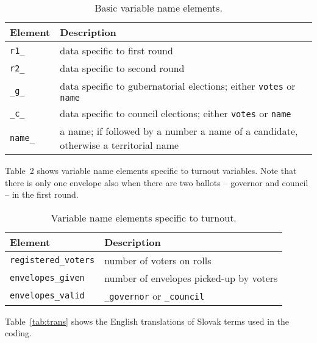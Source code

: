 \documentclass[11pt, a4paper]{article}
\begin{document}
\begin{table}[H]\footnotesize
	\label{tab:modules}
	\caption{Basic variable name elements.}
	\begin{center}
		\begin{tabular}{ll}
			\toprule
			Element	& Description \\		
			\midrule
			\texttt{r1\_}	&	data specific to first round \\
			\texttt{r2\_}	&	data specific to second round \\
			\texttt{\_g\_}	&	data specific to gubernatorial elections; either \texttt{votes} or \texttt{name} \\			
			\texttt{\_c\_}	&	data specific to council elections; either \texttt{votes} or \texttt{name} \\						
			\texttt{name\_}	&	a name; if followed by a number a name of a candidate, otherwise a territorial name \\
			\bottomrule
		\end{tabular}
	\end{center}
\end{table}

Table~2 shows variable name elements specific to turnout variables.
Note that there is only one envelope also when there are two ballots -- governor and council
-- in the first round.

\begin{table}[H]\footnotesize
	\label{tab:turn}
	\caption{Variable name elements specific to turnout.}
	\begin{center}
		\begin{tabular}{ll}
			\toprule
			Element	& Description \\		
			\midrule
			\texttt{registered\_voters}	&	number of voters on rolls \\
			\texttt{envelopes\_given}	&	number of envelopes picked-up by voters\\
			\texttt{envelopes\_valid}	&	\texttt{\_governor} or \texttt{\_council} \\			
			\bottomrule
		\end{tabular}
	\end{center}
\end{table}



Table~\ref{tab:trans} shows the English translations of Slovak terms used in the coding. 
\end{document}
